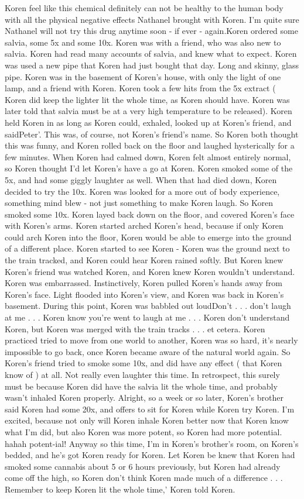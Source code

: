\documentclass[12pt]{book}
\begin{document}
Koren feel like this chemical definitely can not be healthy to the human body with all the physical negative effects Nathanel brought with Koren. I'm quite sure Nathanel will not try this drug anytime soon - if ever - again.Koren ordered some salvia, some 5x and some 10x. Koren was with a friend, who was also new to salvia. Koren had read many accounts of salvia, and knew what to expect. Koren was used a new pipe that Koren had just bought that day. Long and skinny, glass pipe. Koren was in the basement of Koren's house, with only the light of one lamp, and a friend with Koren. Koren took a few hits from the 5x extract ( Koren did keep the lighter lit the whole time, as Koren should have. Koren was later told that salvia must be at a very high temperature to be released). Koren held Koren in as long as Koren could, exhaled, looked up at Koren's friend, and saidPeter'. This was, of course, not Koren's friend's name. So Koren both thought this was funny, and Koren rolled back on the floor and laughed hysterically for a few minutes. When Koren had calmed down, Koren felt almost entirely normal, so Koren thought I'd let Koren's have a go at Koren. Koren smoked some of the 5x, and had some giggly laughter as well. When that had died down, Koren decided to try the 10x. Koren was looked for a more out of body experience, something mind blew - not just something to make Koren laugh. So Koren smoked some 10x. Koren layed back down on the floor, and covered Koren's face with Koren's arms. Koren started arched Koren's head, because if only Koren could arch Koren into the floor, Koren would be able to emerge into the ground of a different place. Koren started to see Koren - Koren was the ground next to the train tracked, and Koren could hear Koren rained softly. But Koren knew Koren's friend was watched Koren, and Koren knew Koren wouldn't understand. Koren was embarrassed. Instinctively, Koren pulled Koren's hands away from Koren's face. Light flooded into Koren's view, and Koren was back in Koren's basement. During this point, Koren was babbled out loudDon't . . .  don't laugh at me . . .  Koren know you're went to laugh at me . . .  Koren don't understand Koren, but Koren was merged with the train tracks . . .  et cetera. Koren practiced tried to move from one world to another, Koren was so hard, it's nearly impossible to go back, once Koren became aware of the natural world again. So Koren's friend tried to smoke some 10x, and did have any effect ( that Koren know of ) at all. Not really even laughter this time. In retrospect, this surely must be because Koren did have the salvia lit the whole time, and probably wasn't inhaled Koren properly. Alright, so a week or so later, Koren's brother said Koren had some 20x, and offers to sit for Koren while Koren try Koren. I'm excited, because not only will Koren inhale Koren better now that Koren know what I'm did, but also Koren was more potent, so Koren had more potential. hahah potent-ial! Anyway so this time, I'm in Koren's brother's room, on Koren's bedded, and he's got Koren ready for Koren. Let Koren be knew that Koren had smoked some cannabis about 5 or 6 hours previously, but Koren had already come off the high, so Koren don't think Koren made much of a difference . . . Remember to keep Koren lit the whole time,' Koren told Koren. 
\end{document}
